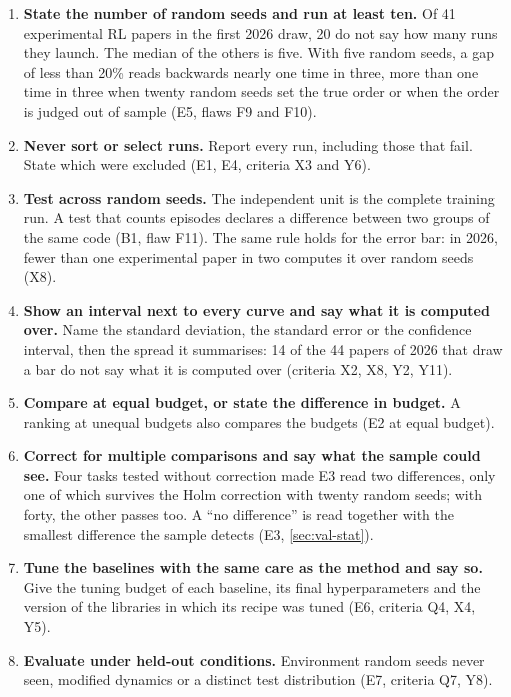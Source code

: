 \begin{enumerate}
  \item \textbf{State the number of random seeds and run at least ten.} Of 41 experimental RL papers
        in the first 2026 draw, 20 do not say how many runs they launch. The median of the others is
        five. With five random seeds, a gap of less than 20\% reads backwards nearly one time in
        three, more than one time in three when twenty random seeds set the true order or when the
        order is judged out of sample (E5, flaws F9 and F10).
  \item \textbf{Never sort or select runs.} Report every run, including those that fail. State which
        were excluded (E1, E4, criteria X3 and Y6).
  \item \textbf{Test across random seeds.} The independent unit is the
        complete training run. A test that counts episodes declares a difference between two groups
        of the same code (B1, flaw F11). The same rule holds for the error bar: in 2026, fewer than
        one experimental paper in two computes it over random seeds (X8).
  \item \textbf{Show an interval next to every curve and say what it is computed over.} Name the
        standard deviation, the standard error or the confidence interval, then the spread it
        summarises: 14 of the 44 papers of 2026 that draw a bar do not say what it is computed over
        (criteria X2, X8, Y2, Y11).
  \item \textbf{Compare at equal budget, or state the difference in budget.} A ranking at unequal
        budgets also compares the budgets (E2 at equal budget).
  \item \textbf{Correct for multiple comparisons and say what the sample could see.} Four tasks
        tested without correction made E3 read two differences, only one of which survives the Holm
        correction with twenty random seeds; with forty, the other passes too. A \enquote{no difference} is read together with the smallest difference the
        sample detects (E3, \cref{sec:val-stat}).
  \item \textbf{Tune the baselines with the same care as the method and say so.} Give the tuning
        budget of each baseline, its final hyperparameters and the version of the libraries in which
        its recipe was tuned (E6, criteria Q4, X4, Y5).
  \item \textbf{Evaluate under held-out conditions.} Environment random seeds never seen, modified
        dynamics or a distinct test distribution (E7, criteria Q7, Y8).

\end{enumerate}
